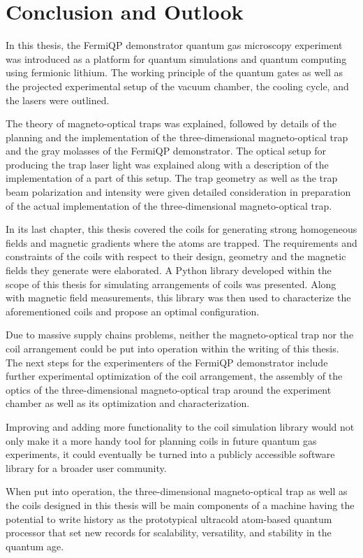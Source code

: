 \renewcommand{\imagepath}{../50-outro/img}

\chapter{Conclusion and Outlook}
In this thesis, the FermiQP demonstrator quantum gas microscopy experiment was introduced as a platform for quantum simulations and quantum computing using fermionic lithium. The working principle of the quantum gates as well as the projected experimental setup of the vacuum chamber, the cooling cycle, and the lasers were outlined.

The theory of magneto-optical traps was explained, followed by details of the planning and the implementation of the three-dimensional magneto-optical trap and the gray molasses of the FermiQP demonstrator. The optical setup for producing the trap laser light was explained along with a description of the implementation of a part of this setup. The trap geometry as well as the trap beam polarization and intensity were given detailed consideration in preparation of the actual implementation of the three-dimensional magneto-optical trap.

In its last chapter, this thesis covered the coils for generating strong homogeneous fields and magnetic gradients where the atoms are trapped. The requirements and constraints of the coils with respect to their design, geometry and the magnetic fields they generate were elaborated. A Python library developed within the scope of this thesis  for simulating arrangements of coils was presented. Along with magnetic field measurements, this library was then used to characterize the aforementioned coils and propose an optimal configuration.

Due to massive supply chains problems, neither the magneto-optical trap nor the coil arrangement could be put into operation within the writing of this thesis. The next steps for the experimenters of the FermiQP demonstrator include further experimental optimization of the coil arrangement, the assembly of the optics of the three-dimensional magneto-optical trap around the experiment chamber as well as its optimization and  characterization.

Improving and adding more functionality to the coil simulation library would not only make it a more handy tool for planning coils in future quantum gas experiments, it could eventually be turned into a publicly accessible software library for a broader user community.

When put into operation, the three-dimensional magneto-optical trap as well as the coils designed in this thesis will be main components of a machine having the potential to write history as the prototypical ultracold atom-based quantum processor that set new records for scalability, versatility, and stability in the quantum age.